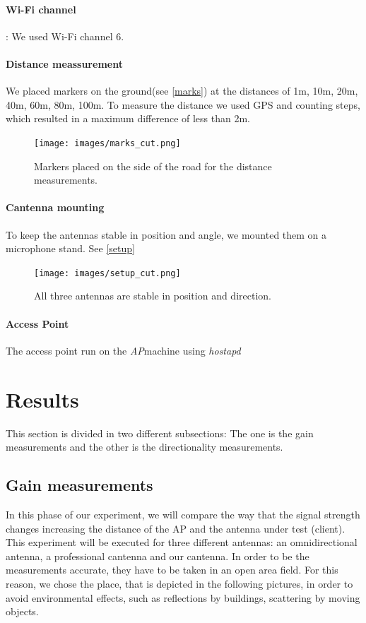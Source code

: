 \documentclass[12pt,a4paper]{article}
\newcommand{\ap}[0]{\emph{AP}}
\begin{document}
		\paragraph{Wi-Fi channel}: We used Wi-Fi channel $6$.
		\paragraph{Distance meassurement} We placed markers on the ground(see \autoref{marks}) at the distances of 1m, 10m, 20m, 40m, 60m, 80m, 100m. To measure the distance we used GPS and counting steps, which resulted in a maximum difference of less than 2m.
		\begin{figure}
			\texttt{[image: images/marks\_cut.png]}
			\caption{Markers placed on the side of the road for the distance measurements.}
			\label{marks}
		\end{figure}
		
		\paragraph{Cantenna mounting} To keep the antennas stable in position and angle, we mounted them on a microphone stand. See \autoref{setup}
		\begin{figure}
			\begin{centering}
				\texttt{[image: images/setup\_cut.png]}
				\caption{All three antennas are stable in position and direction.}
				\label{setup}
			\end{centering}
		\end{figure}
		\paragraph{Access Point} The access point run on the \ap machine using \emph{hostapd}

\section{Results}
	This section is divided in two different subsections: The one is the gain measurements and the other is the directionality measurements. 
	
	\subsection{Gain measurements}
		In this phase of our experiment, we will compare the way that the signal strength changes increasing the distance of the AP and the antenna under test (client). This experiment will be executed for three different antennas: an omnidirectional antenna, a professional cantenna and our cantenna. In order to be the measurements accurate, they have to be taken in an open area field. For this reason, we chose the place, that is depicted in the following pictures, in order to avoid environmental effects, such as reflections by buildings, scattering by moving objects.
	
\end{document}

